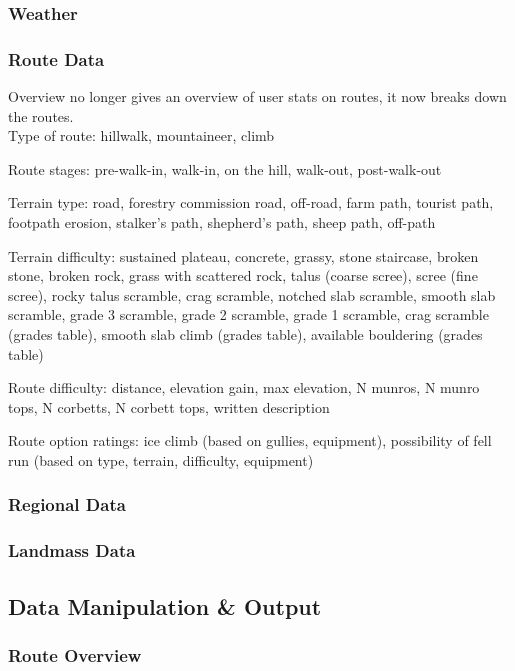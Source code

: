 \documentclass[11pt, english]{article}
\begin{document}
		\subsubsection{Weather}

		\subsubsection{Route Data}

		Overview no longer gives an overview of user stats on routes, it now breaks down the routes.\\

		Type of route: hillwalk, mountaineer, climb

		Route stages: pre-walk-in, walk-in, on the hill, walk-out, post-walk-out

		Terrain type: road, forestry commission road, off-road, farm path, tourist path, footpath erosion, stalker's path, shepherd's path, sheep path, off-path

		Terrain difficulty: sustained plateau, concrete, grassy, stone staircase, broken stone, broken rock, grass with scattered rock, talus (coarse scree), scree (fine scree), rocky talus scramble, crag scramble, notched slab scramble, smooth slab scramble, grade 3 scramble, grade 2 scramble, grade 1 scramble, crag scramble (grades table), smooth slab climb (grades table), available bouldering (grades table)

		Route difficulty: distance, elevation gain, max elevation, N munros, N munro tops, N corbetts, N corbett tops, written description

		Route option ratings: ice climb (based on gullies, equipment), possibility of fell run (based on type, terrain, difficulty, equipment)

		\subsubsection{Regional Data}

		\subsubsection{Landmass Data}

	\subsection{Data Manipulation \& Output}

		\subsubsection{Route Overview}	
	
\end{document}
